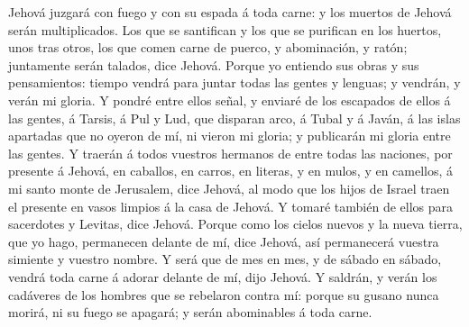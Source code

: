 Jehová juzgará con fuego y con su espada á toda carne: y los muertos de
Jehová serán multiplicados.  Los que se santifican y los
que se purifican en los huertos, unos tras otros, los que comen carne de
puerco, y abominación, y ratón; juntamente serán talados, dice Jehová.
 Porque yo entiendo sus obras y sus pensamientos: tiempo
vendrá para juntar todas las gentes y lenguas; y vendrán, y verán mi
gloria.  Y pondré entre ellos señal, y enviaré de los
escapados de ellos á las gentes, á Tarsis, á Pul y Lud, que disparan
arco, á Tubal y á Javán, á las islas apartadas que no oyeron de mí, ni
vieron mi gloria; y publicarán mi gloria entre las gentes.
 Y traerán á todos vuestros hermanos de entre todas las
naciones, por presente á Jehová, en caballos, en carros, en literas, y
en mulos, y en camellos, á mi santo monte de Jerusalem, dice Jehová, al
modo que los hijos de Israel traen el presente en vasos limpios á la
casa de Jehová.  Y tomaré también de ellos para
sacerdotes y Levitas, dice Jehová.  Porque como los
cielos nuevos y la nueva tierra, que yo hago, permanecen delante de mí,
dice Jehová, así permanecerá vuestra simiente y vuestro nombre.
 Y será que de mes en mes, y de sábado en sábado, vendrá
toda carne á adorar delante de mí, dijo Jehová.  Y
saldrán, y verán los cadáveres de los hombres que se rebelaron contra
mí: porque su gusano nunca morirá, ni su fuego se apagará; y serán
abominables á toda carne.
